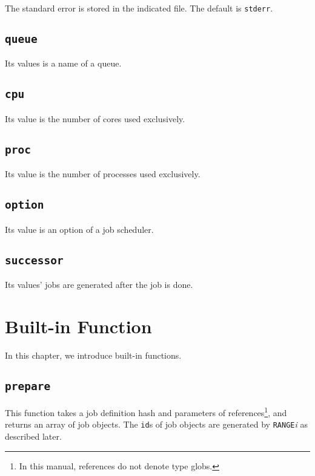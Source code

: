 \documentclass[a4paper,10pt]{report}
\begin{document}
The standard error is stored in the indicated file.
The default is \texttt{stderr}.

\section{\texttt{queue}}

Its values is a name of a queue.

\section{\texttt{cpu}}

Its value is the number of cores used exclusively.

\section{\texttt{proc}}

Its value is the number of processes used exclusively.

\section{\texttt{option}}

Its value is an option of a job scheduler.

\section{\texttt{successor}}

Its values' jobs are generated after the job is done.

\chapter{Built-in Function}\label{chapfun}

In this chapter, we introduce built-in functions.

\def\format{Format}
\def\example{Example}
\def\advanced{Advanced}

\section{\texttt{prepare}}\label{sec:prepare}

This function takes a job definition hash and parameters of
references\footnote{In this manual, references do not denote type
globs.}, and returns an array of job objects.  The \texttt{id}s of job
objects are generated by \texttt{RANGE}\textit{i} as described later.
\end{document}
